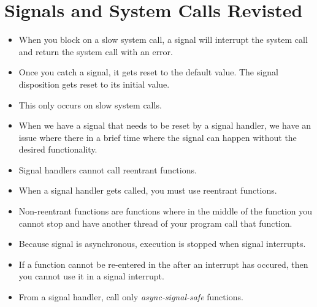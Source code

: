 \documentclass[]{article}
\begin{document}
\section{Signals and System Calls Revisted}
\begin{itemize}
\item When you block on a slow system call, a signal will interrupt the system
call and return the system call with an error.
\item Once you catch a signal, it gets reset to the default value. The signal
disposition gets reset to its initial value.
\item This only occurs on slow system calls.
\item When we have a signal that needs to be reset by a signal handler, we have
an issue where there in a brief time where the signal can happen without the
desired functionality.
\item Signal handlers cannot call reentrant functions.
\item When a signal handler gets called, you must use reentrant functions.
\item Non-reentrant functions are functions where in the middle of the function
you cannot stop and have another thread of your program call that function.
\item Because signal is asynchronous, execution is stopped when signal
interrupts.
\item If a function cannot be re-entered in the after an interrupt has occured,
then you cannot use it in a signal interrupt.
\item From a signal handler, call only \emph{async-signal-safe} functions.
\end{itemize}
\end{document}
